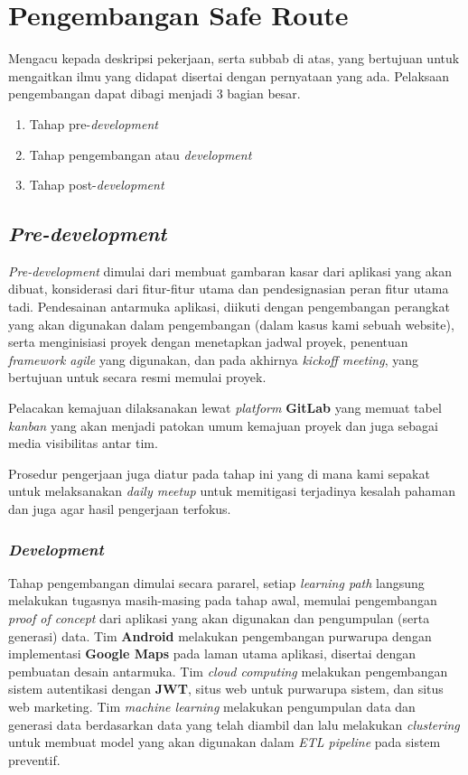 \section{Pengembangan Safe Route}

Mengacu kepada deskripsi pekerjaan, serta subbab di atas, yang bertujuan untuk mengaitkan ilmu yang didapat disertai dengan pernyataan yang ada. Pelaksaan pengembangan dapat dibagi menjadi 3 bagian besar.
\begin{enumerate}
    \item Tahap pre-\textit{development}
    \item Tahap pengembangan atau \textit{development}
    \item Tahap post-\textit{development}
\end{enumerate}

 \subsection{\textit{Pre-development}}
 
\textit{Pre-development} dimulai dari membuat gambaran kasar dari aplikasi yang akan dibuat, konsiderasi dari fitur-fitur utama dan pendesignasian peran fitur utama tadi. Pendesainan antarmuka aplikasi, diikuti dengan pengembangan perangkat yang akan digunakan dalam pengembangan (dalam kasus kami sebuah website), serta menginisiasi proyek dengan menetapkan jadwal proyek, penentuan \textit{framework agile} yang digunakan, dan pada akhirnya \textit{kickoff meeting}, yang bertujuan untuk secara resmi memulai proyek.

Pelacakan kemajuan dilaksanakan lewat \textit{platform} \textbf{GitLab} yang memuat tabel \textit{kanban} yang akan menjadi patokan umum kemajuan proyek dan juga sebagai media visibilitas antar tim.

Prosedur pengerjaan juga diatur pada tahap ini yang di mana kami sepakat untuk melaksanakan \textit{daily meetup} untuk memitigasi terjadinya kesalah pahaman dan juga agar hasil pengerjaan terfokus.

\subsubsection{\textit{Development}}

Tahap pengembangan dimulai secara pararel, setiap \textit{learning path} langsung melakukan tugasnya masih-masing pada tahap awal, memulai pengembangan \textit{proof of concept} dari aplikasi yang akan digunakan dan pengumpulan (serta generasi) data. Tim \textbf{Android} melakukan pengembangan purwarupa dengan implementasi \textbf{Google Maps} pada laman utama aplikasi, disertai dengan pembuatan desain antarmuka. Tim \textit{cloud computing} melakukan pengembangan sistem autentikasi dengan \textbf{JWT}, situs web untuk purwarupa sistem, dan situs web marketing. Tim \textit{machine learning} melakukan pengumpulan data dan generasi data berdasarkan data yang telah diambil dan lalu melakukan \textit{clustering} untuk membuat model yang akan digunakan dalam \textit{ETL pipeline} pada sistem preventif.

